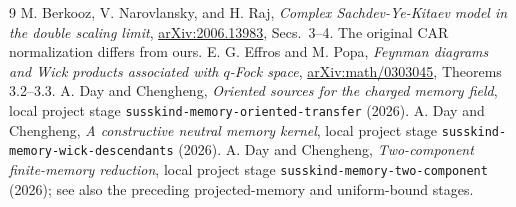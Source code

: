 \documentclass[11pt]{article}
\begin{document}
\begin{thebibliography}{9}
 M. Berkooz, V. Narovlansky, and H. Raj,
\emph{Complex Sachdev-Ye-Kitaev model in the double scaling limit},
\href{https://arxiv.org/abs/2006.13983}{arXiv:2006.13983},
Secs.~3--4. The original CAR normalization differs from ours.
 E. G. Effros and M. Popa,
\emph{Feynman diagrams and Wick products associated with $q$-Fock space},
\href{https://arxiv.org/abs/math/0303045}{arXiv:math/0303045},
Theorems 3.2--3.3.
 A. Day and Chengheng,
\emph{Oriented sources for the charged memory field}, local project
stage \texttt{susskind-memory-oriented-transfer} (2026).
 A. Day and Chengheng,
\emph{A constructive neutral memory kernel}, local project stage
\texttt{susskind-memory-wick-descendants} (2026).
 A. Day and Chengheng,
\emph{Two-component finite-memory reduction}, local project stage
\texttt{susskind-memory-two-component} (2026); see also the preceding
projected-memory and uniform-bound stages.
\end{thebibliography}
\end{document}
